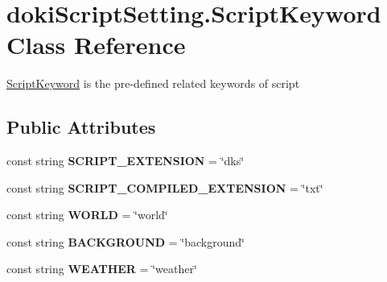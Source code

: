 \hypertarget{classdoki_script_setting_1_1_script_keyword}{}\section{doki\+Script\+Setting.\+Script\+Keyword Class Reference}
\label{classdoki_script_setting_1_1_script_keyword}


\hyperlink{classdoki_script_setting_1_1_script_keyword}{Script\+Keyword} is the pre-\/defined related keywords of script  


\subsection*{Public Attributes}
\begin{DoxyCompactItemize}
\item 
const string {\bfseries S\+C\+R\+I\+P\+T\+\_\+\+E\+X\+T\+E\+N\+S\+I\+ON} = \char`\"{}dks\char`\"{}\hypertarget{classdoki_script_setting_1_1_script_keyword_a131141ba69563d9b6d3672b7904a7bf3}{}\label{classdoki_script_setting_1_1_script_keyword_a131141ba69563d9b6d3672b7904a7bf3}

\item 
const string {\bfseries S\+C\+R\+I\+P\+T\+\_\+\+C\+O\+M\+P\+I\+L\+E\+D\+\_\+\+E\+X\+T\+E\+N\+S\+I\+ON} = \char`\"{}txt\char`\"{}\hypertarget{classdoki_script_setting_1_1_script_keyword_a8499133323bfb65ad465f8dff32eee69}{}\label{classdoki_script_setting_1_1_script_keyword_a8499133323bfb65ad465f8dff32eee69}

\item 
const string {\bfseries W\+O\+R\+LD} = \char`\"{}world\char`\"{}\hypertarget{classdoki_script_setting_1_1_script_keyword_abc707d180df77142ce62c0044e58a2f0}{}\label{classdoki_script_setting_1_1_script_keyword_abc707d180df77142ce62c0044e58a2f0}

\item 
const string {\bfseries B\+A\+C\+K\+G\+R\+O\+U\+ND} = \char`\"{}background\char`\"{}\hypertarget{classdoki_script_setting_1_1_script_keyword_a71e98925fa468e7c5d732a1e5f78c7cd}{}\label{classdoki_script_setting_1_1_script_keyword_a71e98925fa468e7c5d732a1e5f78c7cd}

\item 
const string {\bfseries W\+E\+A\+T\+H\+ER} = \char`\"{}weather\char`\"{}\hypertarget{classdoki_script_setting_1_1_script_keyword_a461ac9dcc865863cd5a0a9bd0e2c216c}{}\label{classdoki_script_setting_1_1_script_keyword_a461ac9dcc865863cd5a0a9bd0e2c216c}


\end{DoxyCompactItemize}
